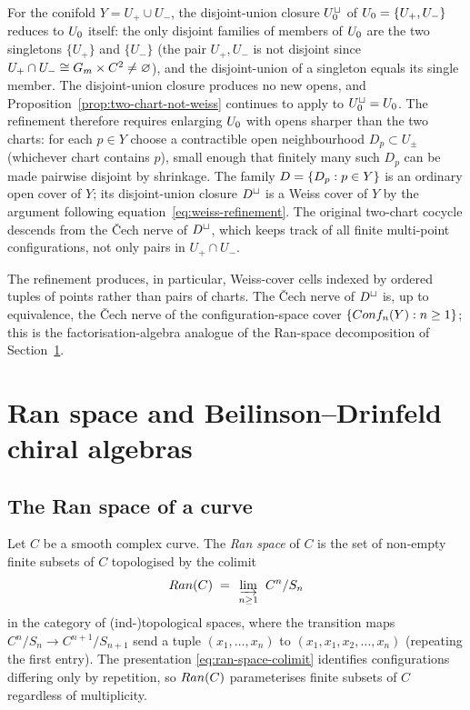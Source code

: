 \begin{remark}
\label{rem:weiss-refinement-conifold}
For the conifold $Y = U_+ \cup U_-$, the disjoint-union closure
$U_0^{\sqcup}$ of $U_0 = \{U_+, U_-\}$ reduces to $U_0$ itself:
the only disjoint families of members of $U_0$ are the two singletons
$\{U_+\}$ and $\{U_-\}$ (the pair $U_+, U_-$ is not disjoint since
$U_+ \cap U_- \cong G_m \times C^2 \ne \varnothing$), and the
disjoint-union of a singleton equals its single member. The
disjoint-union closure produces no new opens, and
Proposition~\ref{prop:two-chart-not-weiss} continues to apply to
$U_0^{\sqcup} = U_0$. The refinement therefore requires enlarging
$U_0$ with opens sharper than the two charts: for each $p \in Y$ choose
a contractible open neighbourhood $D_p \subset U_\pm$ (whichever chart
contains $p$), small enough that finitely many such $D_p$ can be made
pairwise disjoint by shrinkage. The family $D = \{D_p : p \in Y\}$
is an ordinary open cover of $Y$; its disjoint-union closure $D^{\sqcup}$
is a Weiss cover of $Y$ by the argument following
equation~\eqref{eq:weiss-refinement}. The original two-chart cocycle
descends from the \v{C}ech nerve of $D^{\sqcup}$, which keeps track of
all finite multi-point configurations, not only pairs in
$U_+ \cap U_-$.
\end{remark}

The refinement produces, in particular, Weiss-cover cells indexed by
ordered tuples of points rather than pairs of charts. The Čech nerve
of $D^{\sqcup}$ is, up to equivalence, the Čech nerve of the
configuration-space cover $\{Conf_n(Y) : n \ge 1\}$; this is the
factorisation-algebra analogue of the Ran-space decomposition of
Section~\ref{sec:fa-ran-bd}.

\section{Ran space and Beilinson--Drinfeld chiral algebras}
\label{sec:fa-ran-bd}

\subsection{The Ran space of a curve}

Let $C$ be a smooth complex curve. The \emph{Ran space} of $C$ is the
set of non-empty finite subsets of $C$ topologised by the colimit
\begin{equation}
\label{eq:ran-space-colimit}
  Ran(C) \;=\; \varinjlim_{\, n \ge 1\,} \; C^n / S_n
\end{equation}
in the category of (ind-)topological spaces, where the transition maps
$C^n/S_n \to C^{n+1}/S_{n+1}$ send a tuple $(x_1, \dots, x_n)$ to
$(x_1, x_1, x_2, \dots, x_n)$ (repeating the first entry). The
presentation \eqref{eq:ran-space-colimit} identifies configurations
differing only by repetition, so $Ran(C)$ parameterises finite subsets
of $C$ regardless of multiplicity.


